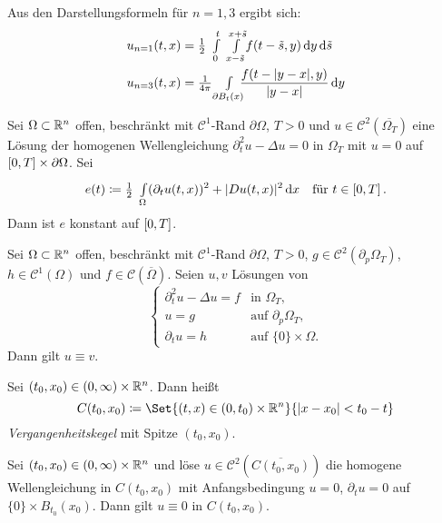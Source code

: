 \documentclass{cheat-sheet}
\begin{document}
\begin{bem}
  Aus den Darstellungsformeln für $n=1,3$ ergibt sich:
  \begin{align*}
    u_{n=1}(t, x) &= \tfrac{1}{2} \enspace \Int{0}{t}{\enspace \Int{x - \tilde{s}}{x + \tilde{s}}{f(t - \tilde{s}, y)}{y}}{\tilde{s}} \\
    u_{n=3}(t, x) &= \tfrac{1}{4 \pi} \quad \Int{\mathclap{\partial B_t(x)}}{}{\enspace \frac{f(t - \abs{y-x}, y)}{\abs{y-x}}}{y}
  \end{align*}
\end{bem}



\begin{lem}
  Sei $\Omega \subset \mathbb{R}^n$ offen, beschränkt mit $\mathcal{C}^1$-Rand $\partial \Omega$, $T > 0$ und $u \in \mathcal{C}^2(\overline{\Omega_T})$ eine Lösung der homogenen Wellengleichung $\partial_t^2 u - \Delta u = 0$ in $\Omega_T$ mit $u = 0$ auf $\left[ 0, T \right] \times \partial \Omega$. Sei
  \[
    e(t) \coloneqq \tfrac{1}{2} \enspace {\textstyle \int\limits_{\Omega}^{}} (\partial_t u(t,x))^2 + \lvert D u(t,x)\rvert^2 \,\mathrm{d} x \quad \text{für } t \in \left[ 0, T \right].
  \]
  Dann ist $e$ konstant auf $\left[ 0, T \right]$.
\end{lem}

\begin{satz}
  Sei $\Omega \subset \mathbb{R}^n$ offen, beschränkt mit $\mathcal{C}^1$-Rand $\partial \Omega$, $T > 0$, $g \in \mathcal{C}^2(\partial_p \Omega_T)$, $h \in \mathcal{C}^1(\Omega)$ und $f \in \mathcal{C}(\overline{\Omega})$. Seien $u, v$ Lösungen von
  \[
    \left\{ \begin{array}{ll}
      \partial_t^2 u - \Delta u = f & \text{in } \Omega_T, \\
      u = g & \text{auf } \partial_p \Omega_T, \\
      \partial_t u = h & \text{auf } \{ 0 \} \times \Omega.
    \end{array} \right.
  \]
  Dann gilt $u \equiv v$.
\end{satz}

\begin{defn}
  Sei $(t_0, x_0) \in \left( 0, \infty \right) \times \mathbb{R}^n$. Dann heißt
  \[
    C(t_0, x_0) \coloneqq \Set{(t, x) \in \ointerval{0}{t_0} \times \R^n}{ \abs{x-x_0} < t_0 - t }
  \]
  \emph{Vergangenheitskegel} mit Spitze $(t_0, x_0)$.
\end{defn}

\begin{satz}
  Sei $(t_0, x_0) \in \left( 0, \infty \right) \times \mathbb{R}^n$ und löse $u \in \mathcal{C}^2(\overline{C(t_0, x_0)})$ die homogene Wellengleichung in $C(t_0, x_0)$ mit Anfangsbedingung $u = 0$, $\partial_t u = 0$ auf $\{ 0 \} \times B_{t_0}(x_0)$. Dann gilt $u \equiv 0$ in $C(t_0, x_0)$.
\end{satz}
\end{document}
